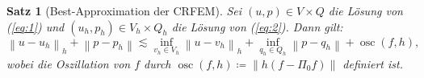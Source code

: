 \documentclass[a4paper, 10pt]{article}
\newcommand{\norm}[1][\cdot]{\left\lVert#1\right\rVert}
\newcommand{\lpo}{\Pi_0}
\DeclareMathOperator{\osc}{osc}
\theoremstyle{definition}
\theoremstyle{plain}
\newtheorem{satz}{Satz}
\begin{document}
\vspace{3mm}

\begin{satz}[Best-Approximation der CRFEM]\label{thm:4}
  Sei \((u,p) \in V\times Q\) die Lösung von (\ref{eq:1}) und
  \((u_h,p_h) \in  V_h\times Q_h\) die Lösung von (\ref{eq:2}). Dann
  gilt: 
  \begin{equation}
    \label{eq:3}
    \norm[u - u_h]_h + \norm[p - p_h] \lesssim \inf_{v_h \in V_h} \norm[u - v_h]_h + \inf_{q_h \in Q_h} \norm[p - q_h] + \osc(f,h), 
  \end{equation}
  wobei die Oszillation von \(f\) durch  \(\osc(f, h) \coloneqq
  \norm[h(f - \lpo f)]\) definiert ist. 
\end{satz}
\end{document}
